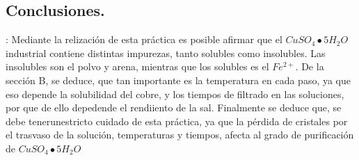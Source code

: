 \documentclass[a4paper,12pt]{article}
\begin{document}
 \subsection{Conclusiones.}: Mediante la relización de esta práctica es posible afirmar que el $CuSO_4\bullet5H_2O$ industrial contiene distintas impurezas, tanto solubles como insolubles. Las insolubles son el polvo y arena, mientras que los solubles es el $Fe^{2+}$. De la sección B, se deduce, que tan importante es la temperatura en cada paso, ya que eso depende la solubilidad del cobre, y los tiempos de filtrado en las soluciones, por que de ello depedende el rendiiento de la sal. Finalmente se deduce que, se debe tenerunestricto cuidado de esta práctica, ya que la pérdida de cristales por el trasvaso de la solución, temperaturas y tiempos, afecta al grado de purificación de $CuSO_4\bullet5H_2O$
 
\end{document}
